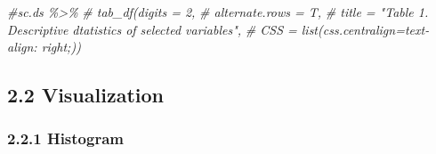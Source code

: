\documentclass[
]{article}
\newenvironment{Shaded}{\begin{snugshade}}{\end{snugshade}}
\newcommand{\CommentTok}[1]{\textcolor[rgb]{0.56,0.35,0.01}{\textit{#1}}}
\begin{document}
\begin{Shaded}
\begin{Highlighting}[]
\CommentTok{\#sc.ds \%\textgreater{}\%}
\CommentTok{\#  tab\_df(digits = 2, }
\CommentTok{\#        alternate.rows = T,}
\CommentTok{\#        title = "Table 1. Descriptive dtatistics of selected variables",}
\CommentTok{\#        CSS = list(css.centralign=\textquotesingle{}text{-}align: right;\textquotesingle{}))}
\end{Highlighting}
\end{Shaded}

\hypertarget{visualization}{%
\subsection{2.2 Visualization}\label{visualization}}

\hypertarget{histogram}{%
\subsubsection{2.2.1 Histogram}\label{histogram}}
\end{document}
